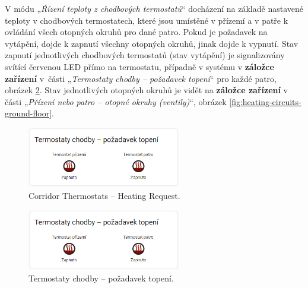\begin{Czech}
V módu „\textit{Řízení teploty z chodbových termostatů}“ docházení na základě nastavené teploty v chodbových termostatech, které jsou umístěné v přízemí a v patře k ovládání všech otopných okruhů pro dané patro. Pokud je požadavek na vytápění, dojde k zapnutí všechny otopných okruhů, jinak dojde k vypnutí. Stav zapnutí jednotlivých chodbových termostatů (stav vytápění) je signalizovány svítící červenou LED přímo na termostatu, případně v systému v \textbf{záložce zařízení} \mbox{v části} „\textit{Termostaty chodby – požadavek topení}“ pro každé patro, obrázek \ref{fig:corridor-thermostats}. Stav jednotlivých otopných okruhů je vidět na \textbf{záložce zařízení} v části „\textit{Přízení nebo patro – otopné okruhy (ventily)}“, obrázek \ref{fig:heating-circuits-ground-floor}.
\end{Czech}


\begin{English}
\begin{figure}[H]
    \centering
    \includegraphics[width=0.6\textwidth]{pictures/czech/software/corridor-thermostats.png}
    \caption{Corridor Thermostats – Heating Request.}
    \label{fig:corridor-thermostats}
\end{figure}
\end{English}

\begin{Czech}
\begin{figure}[H]
    \centering
    \includegraphics[width=0.6\textwidth]{pictures/czech/software/corridor-thermostats.png}
    \caption{Termostaty chodby – požadavek topení.}
    \label{fig:corridor-thermostats}
\end{figure}
\end{Czech}



